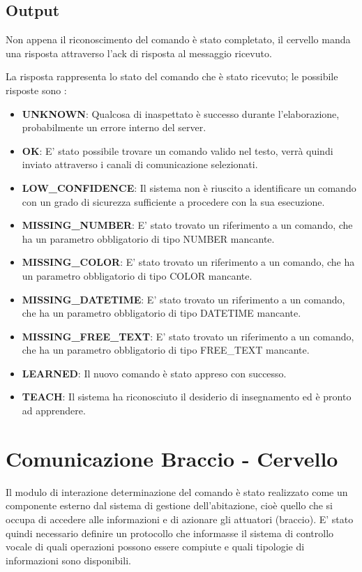 \documentclass[twoside]{supsistudent}
\begin{document}
\section{Output}
Non appena il riconoscimento del comando è stato completato, il cervello manda una risposta attraverso l'ack di risposta al messaggio ricevuto.

La risposta rappresenta lo stato del comando che è stato ricevuto; le possibile risposte sono :

\begin{itemize}
	\item \textbf{UNKNOWN}: Qualcosa di inaspettato è successo durante l'elaborazione, probabilmente un errore interno del server.
	\item \textbf{OK}: E' stato possibile trovare un comando valido nel testo, verrà quindi inviato attraverso i canali di comunicazione selezionati.
	\item \textbf{LOW\_CONFIDENCE}: Il sistema non è riuscito a identificare un comando con un grado di sicurezza sufficiente a procedere con la sua esecuzione.
	\item \textbf{MISSING\_NUMBER}: E' stato trovato un riferimento a un comando, che ha un parametro obbligatorio di tipo NUMBER mancante.
	\item \textbf{MISSING\_COLOR}: E' stato trovato un riferimento a un comando, che ha un parametro obbligatorio di tipo COLOR mancante.
	\item \textbf{MISSING\_DATETIME}: E' stato trovato un riferimento a un comando, che ha un parametro obbligatorio di tipo DATETIME mancante.
	\item \textbf{MISSING\_FREE\_TEXT}: E' stato trovato un riferimento a un comando, che ha un parametro obbligatorio di tipo FREE\_TEXT mancante.
	\item \textbf{LEARNED}: Il nuovo comando è stato appreso con successo.
	\item \textbf{TEACH}: Il sistema ha riconosciuto il desiderio di insegnamento ed è pronto ad apprendere.
\end{itemize}

\chapter{Comunicazione Braccio - Cervello }
Il modulo di interazione determinazione del comando è stato realizzato come un componente esterno dal sistema di gestione dell'abitazione, cioè quello che si occupa di accedere alle informazioni e di azionare gli attuatori (braccio). E' stato quindi necessario definire un protocollo che informasse il sistema di controllo vocale di quali operazioni possono essere compiute e quali tipologie di informazioni sono disponibili.
\end{document}
